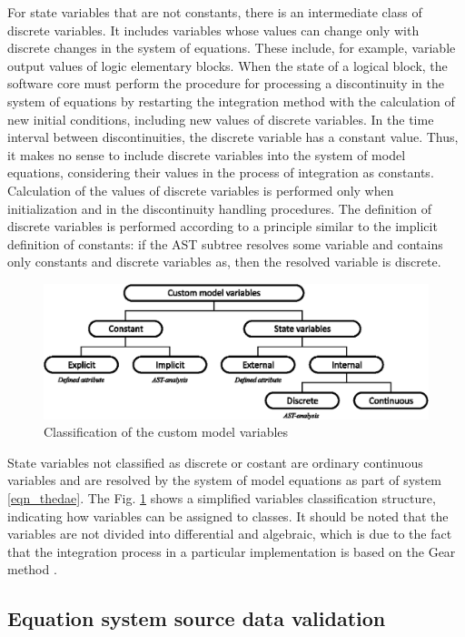 \documentclass[lettersize,journal]{IEEEtran}
\begin{document}
For state variables that are not constants, there is an intermediate class of discrete variables. It includes variables whose 
values can change only with discrete changes in the system of equations. These include, for example, variable output values of
logic elementary blocks. When the state of a logical block, the software core must perform the procedure for processing a
discontinuity in the system of equations by restarting the integration method with the calculation of new initial conditions,
including new values of discrete variables. In the time interval between discontinuities, the discrete variable has a constant
value. Thus, it makes no sense to include discrete variables into the system of model equations, considering their values in the
process of integration as constants. Calculation of the values of discrete variables is performed only when initialization and in
the discontinuity handling procedures. The definition of discrete variables is performed according to a principle similar 
to the implicit definition of constants: if the AST subtree resolves some variable and contains only constants and discrete
variables as, then the resolved variable is discrete.

\begin{figure}[h]
	\centering
	\includegraphics[width=\columnwidth]{variables.eps}
	\caption{Classification of the custom model variables}
	\label{fig_vars}
\end{figure}

State variables not classified as discrete or costant are ordinary continuous variables and are resolved by the system of model
equations as part of system \eqref{eqn_thedae}. The Fig. \ref{fig_vars} shows a simplified variables classification structure,
indicating how variables can be assigned to classes. 
It should be noted that the variables are not divided into differential and algebraic, which is due to the fact that the 
integration process in a particular implementation is based on the Gear method \cite{gear71}.

\subsection {Equation system source data validation} \label{sec_validation}
\end{document}
